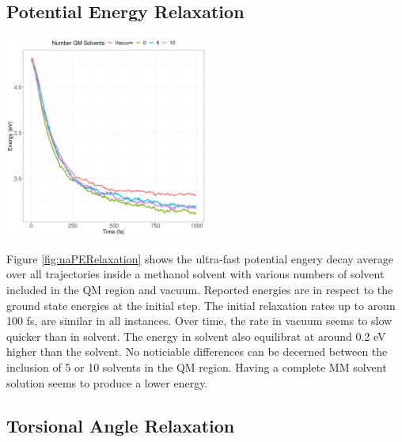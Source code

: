 \subsection{Potential Energy Relaxation}

\noindent
\begin{minipage}[c]{\textwidth}
  \centering
  \includegraphics[width=0.5\textwidth]{../Paper2/Images/potential_energies/solvent_comparison.png}
  \label{fig:naPERelaxation}
\end{minipage}\bigskip

Figure \ref{fig:naPERelaxation} shows the ultra-fast potential engery decay average over all trajectories inside a methanol solvent with various numbers of solvent included in the QM region and vacuum.
Reported energies are in respect to the ground state energies at the initial step.
The initial relaxation rates up to aroun 100 fs, are similar in all instances.
Over time, the rate in vacuum seems to slow quicker than in solvent.
The energy in solvent also equilibrat at around 0.2 eV higher than the solvent.
No noticiable differences can be decerned between the inclusion of 5 or 10 solvents in the QM region.
Having a complete MM solvent solution seems to produce a lower energy.

\subsection{Torsional Angle Relaxation}

